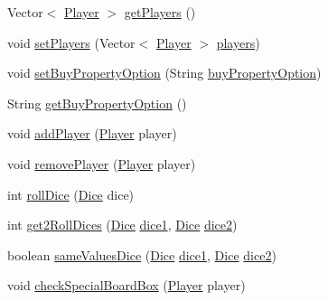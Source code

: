 \begin{DoxyCompactItemize}
\item 
Vector$<$ \hyperlink{class_monopoly_1_1_logic_1_1_player}{Player} $>$ \hyperlink{class_monopoly_1_1_logic_1_1_game_a057dfd53e851958229778a86c2981d7b}{get\+Players} ()
\item 
void \hyperlink{class_monopoly_1_1_logic_1_1_game_aaec73fbd020584b525f83bdb47ec9040}{set\+Players} (Vector$<$ \hyperlink{class_monopoly_1_1_logic_1_1_player}{Player} $>$ \hyperlink{class_monopoly_1_1_logic_1_1_game_abc3b3d5d0514ad27889ffd8f80cb58e9}{players})
\item 
void \hyperlink{class_monopoly_1_1_logic_1_1_game_acebd95e8402db56b3c5771dad1a077da}{set\+Buy\+Property\+Option} (String \hyperlink{class_monopoly_1_1_logic_1_1_game_abb784248ea530aa3048e3d0bb446bc1a}{buy\+Property\+Option})
\item 
String \hyperlink{class_monopoly_1_1_logic_1_1_game_ae7c6b79a95e1d1dc8f7d8bd47e93f506}{get\+Buy\+Property\+Option} ()
\item 
void \hyperlink{class_monopoly_1_1_logic_1_1_game_a349c8f09683bfc289c9dc4df4c276661}{add\+Player} (\hyperlink{class_monopoly_1_1_logic_1_1_player}{Player} player)
\item 
void \hyperlink{class_monopoly_1_1_logic_1_1_game_aa229aa82e1a30f6e17bc10aaef31ba04}{remove\+Player} (\hyperlink{class_monopoly_1_1_logic_1_1_player}{Player} player)
\item 
int \hyperlink{class_monopoly_1_1_logic_1_1_game_a39ddf33998efee021f9680b733017fb3}{roll\+Dice} (\hyperlink{class_monopoly_1_1_logic_1_1_dice}{Dice} dice)
\item 
int \hyperlink{class_monopoly_1_1_logic_1_1_game_ae9de8479abf1ab8fb0ad7811ebcf176c}{get2\+Roll\+Dices} (\hyperlink{class_monopoly_1_1_logic_1_1_dice}{Dice} \hyperlink{class_monopoly_1_1_logic_1_1_game_ade748d7293525398b9c16959dbb5dd30}{dice1}, \hyperlink{class_monopoly_1_1_logic_1_1_dice}{Dice} \hyperlink{class_monopoly_1_1_logic_1_1_game_af248656616e885a175559dc3a1131478}{dice2})
\item 
boolean \hyperlink{class_monopoly_1_1_logic_1_1_game_a8454773c0f8d469f9c6e6a2583cb2ce1}{same\+Values\+Dice} (\hyperlink{class_monopoly_1_1_logic_1_1_dice}{Dice} \hyperlink{class_monopoly_1_1_logic_1_1_game_ade748d7293525398b9c16959dbb5dd30}{dice1}, \hyperlink{class_monopoly_1_1_logic_1_1_dice}{Dice} \hyperlink{class_monopoly_1_1_logic_1_1_game_af248656616e885a175559dc3a1131478}{dice2})
\item 
void \hyperlink{class_monopoly_1_1_logic_1_1_game_a44fa0ecfe376ed217a51031210942d70}{check\+Special\+Board\+Box} (\hyperlink{class_monopoly_1_1_logic_1_1_player}{Player} player)

\end{DoxyCompactItemize}
